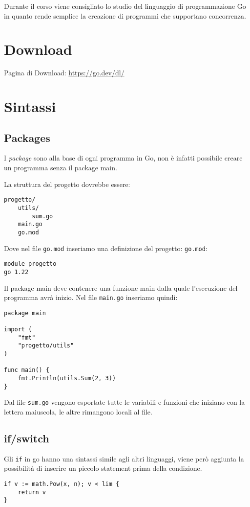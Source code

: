 Durante il corso viene consigliato lo studio del linguaggio di programmazione Go in quanto rende semplice la creazione di programmi che supportano concorrenza.

\section{Download}
Pagina di Download: \href{https://go.dev/dl/}{https://go.dev/dl/}

\section{Sintassi}

\subsection{Packages}
I \textit{package} sono alla base di ogni programma in Go, non è infatti possibile creare un programma senza il package main.

\spacer
La struttura del progetto dovrebbe essere:
\begin{verbatim}
progetto/
    utils/
        sum.go
    main.go
    go.mod
\end{verbatim}

\spacer
Dove nel file \texttt{go.mod} inseriamo una definizione del progetto:
\texttt{go.mod}:
\begin{verbatim}
module progetto
go 1.22
\end{verbatim}

\spacer
Il package main deve contenere una funzione main dalla quale l'esecuzione del programma avrà inizio. Nel file \texttt{main.go} inseriamo quindi:
\begin{verbatim}
package main

import (
    "fmt"
    "progetto/utils"
)

func main() {
    fmt.Println(utils.Sum(2, 3))
}
\end{verbatim}

Dal file \texttt{sum.go} vengono esportate tutte le variabili e funzioni che iniziano con la lettera maiuscola, le altre rimangono locali al file.

\subsection{if/switch}
Gli \texttt{if} in go hanno una sintassi simile agli altri linguaggi, viene però aggiunta la possibilità di inserire un piccolo statement prima della condizione.
\begin{verbatim}
if v := math.Pow(x, n); v < lim {
    return v
}
\end{verbatim}

